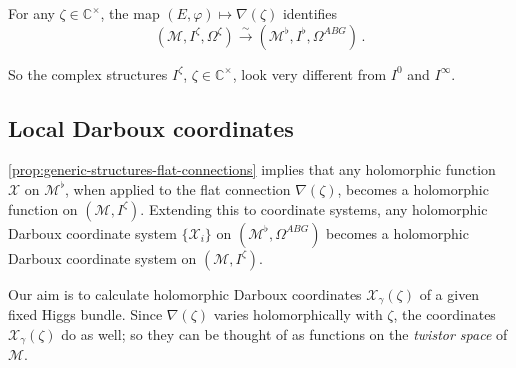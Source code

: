 \documentclass[12pt,letterpaper,reqno]{article}
\numberwithin{equation}{section}
\newcommand{\cM}{\ensuremath{\mathcal M}}
\newcommand{\cX}{\ensuremath{\mathcal X}}
\newcommand{\bbC}{\ensuremath{\mathbb C}}
\newcommand{\simarrow}{\xrightarrow\sim}
\newcommand{\ti}[1]{\textit{#1}}
\begin{document}
\begin{prop} \label{prop:generic-structures-flat-connections} For any $\zeta \in \bbC^\times$,
the map $(E,\varphi) \mapsto \nabla(\zeta)$ identifies
\begin{equation}
  (\cM, I^\zeta, \Omega^\zeta) \simarrow (\cM^\flat, I^\flat, \Omega^{ABG}) \, .
\end{equation}
\end{prop}

So the complex structures $I^\zeta$, $\zeta \in \bbC^\times$, look very different
from $I^0$ and $I^\infty$.


\subsection{Local Darboux coordinates}

\autoref{prop:generic-structures-flat-connections} 
implies that any holomorphic function $\cX$ on $\cM^\flat$,
when applied to
the flat connection $\nabla(\zeta)$, becomes a holomorphic
function on $(\cM, I^\zeta)$.
Extending this to coordinate systems, any holomorphic 
Darboux coordinate system $\{\cX_i\}$ on $(\cM^\flat, \Omega^{ABG})$
becomes a holomorphic Darboux coordinate system on
$(\cM, I^\zeta)$.

Our aim is to calculate holomorphic Darboux
coordinates $\cX_\gamma(\zeta)$ of a given fixed Higgs bundle.
Since $\nabla(\zeta)$ varies
holomorphically with $\zeta$, the coordinates
$\cX_\gamma(\zeta)$ do as well; so they can be thought of
as functions on the \ti{twistor space} of $\cM$.
\end{document}
